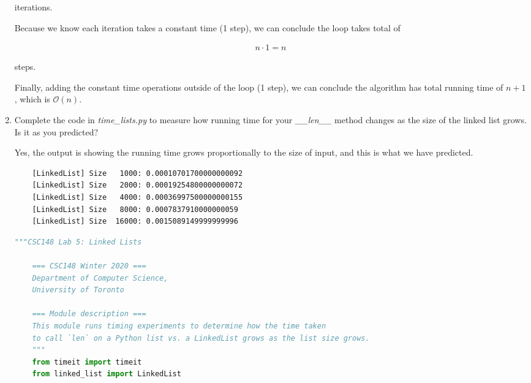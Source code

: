 \documentclass[12pt]{article}
\begin{document}
\begin{enumerate}[1.]
\begin{mdframed}
    iterations.

    \bigskip

    Because we know each iteration takes a constant time (1 step), we can conclude
    the loop takes total of

    \begin{align}
        n \cdot 1 = n
    \end{align}

    \bigskip

    steps.

    \bigskip

    Finally, adding the constant time operations outside of the loop (1 step),
    we can conclude the algorithm has total running time of $n + 1$, which is
    $\mathcal{O}(n)$.

    \end{mdframed}

    \item Complete the code in \textit{time\_lists.py} to measure how running
    time for your \textit{\_\_len\_\_} method changes as the size of the linked
    list grows. Is it as you predicted?

    \bigskip

    \begin{mdframed}
    Yes, the output is showing the running time grows proportionally to the size
    of input, and this is what we have predicted.

    \bigskip

    \begin{lstlisting}
    [LinkedList] Size   1000: 0.00010701700000000092
    [LinkedList] Size   2000: 0.00019254800000000072
    [LinkedList] Size   4000: 0.00036997500000000155
    [LinkedList] Size   8000: 0.0007837910000000059
    [LinkedList] Size  16000: 0.0015089149999999996
    \end{lstlisting}

    \bigskip

    \begin{lstlisting}[language=python,caption={task\_2\_step\_3\_solution.py}]
    """CSC148 Lab 5: Linked Lists

    === CSC148 Winter 2020 ===
    Department of Computer Science,
    University of Toronto

    === Module description ===
    This module runs timing experiments to determine how the time taken
    to call `len` on a Python list vs. a LinkedList grows as the list size grows.
    """
    from timeit import timeit
    from linked_list import LinkedList


\end{lstlisting}
\end{mdframed}
\end{enumerate}
\end{document}
